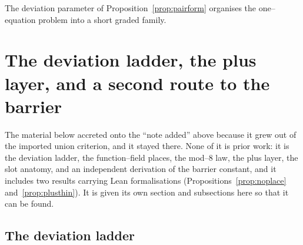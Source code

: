 \documentclass[11pt]{article}
\theoremstyle{definition}
\begin{document}
The deviation parameter of Proposition~\ref{prop:pairform} organises the one--equation problem into a
short graded family.

\section{The deviation ladder, the plus layer, and a second route to the barrier}\label{sec:ladderplus}

The material below accreted onto the ``note added'' above because it grew out of the imported
union criterion, and it stayed there. None of it is prior work: it is the deviation ladder, the
function--field places, the mod--$8$ law, the plus layer, the slot anatomy, and an independent
derivation of the barrier constant, and it includes two results carrying Lean formalisations
(Propositions~\ref{prop:noplace} and~\ref{prop:plusthin}). It is given its own section and
subsections here so that it can be found.

\subsection{The deviation ladder}\label{ssec:ladder}
\end{document}
